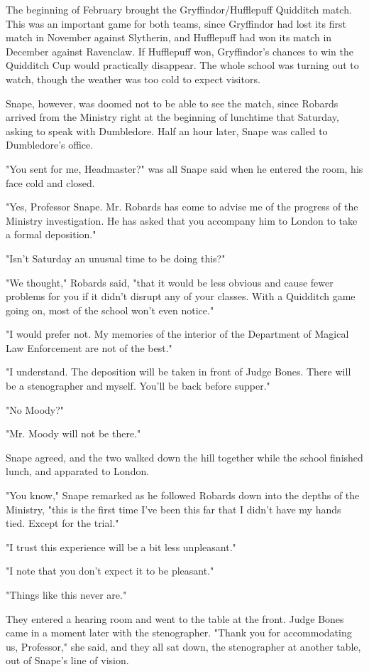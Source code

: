 \documentclass[a4paper,11pt]{article}
\begin{document}
The beginning of February brought the Gryffindor/Hufflepuff Quidditch match. This was an important game for both teams, since Gryffindor had lost its first match in November against Slytherin, and Hufflepuff had won its match in December against Ravenclaw. If Hufflepuff won, Gryffindor's chances to win the Quidditch Cup would practically disappear. The whole school was turning out to watch, though the weather was too cold to expect visitors.

Snape, however, was doomed not to be able to see the match, since Robards arrived from the Ministry right at the beginning of lunchtime that Saturday, asking to speak with Dumbledore. Half an hour later, Snape was called to Dumbledore's office.

"You sent for me, Headmaster?" was all Snape said when he entered the room, his face cold and closed.

"Yes, Professor Snape. Mr. Robards has come to advise me of the progress of the Ministry investigation. He has asked that you accompany him to London to take a formal deposition."

"Isn't Saturday an unusual time to be doing this?"

"We thought," Robards said, "that it would be less obvious and cause fewer problems for you if it didn't disrupt any of your classes. With a Quidditch game going on, most of the school won't even notice."

"I would prefer not. My memories of the interior of the Department of Magical Law Enforcement are not of the best."

"I understand. The deposition will be taken in front of Judge Bones. There will be a stenographer and myself. You'll be back before supper."

"No Moody?"

"Mr. Moody will not be there."

Snape agreed, and the two walked down the hill together while the school finished lunch, and apparated to London.

"You know," Snape remarked as he followed Robards down into the depths of the Ministry, "this is the first time I've been this far that I didn't have my hands tied. Except for the trial."

"I trust this experience will be a bit less unpleasant."

"I note that you don't expect it to be pleasant."

"Things like this never are."

They entered a hearing room and went to the table at the front. Judge Bones came in a moment later with the stenographer. "Thank you for accommodating us, Professor," she said, and they all sat down, the stenographer at another table, out of Snape's line of vision.
\end{document}
